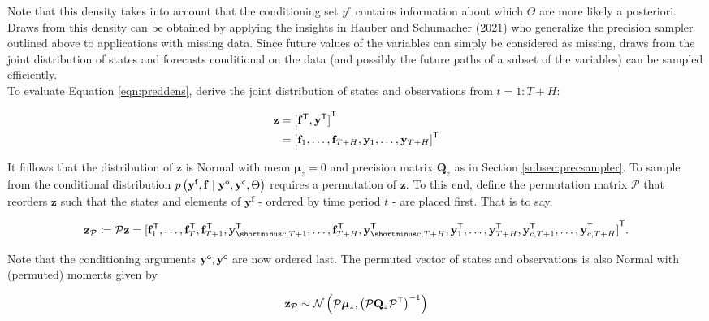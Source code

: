 \documentclass[notitlepage,a4paper,12pt]{article}
\newcommand{\transpose}[1]{{#1}^{\sf{T}}}
\begin{document}
Note that this density takes into account that the conditioning set $y^c$ contains information about which $\Theta$ are more likely a posteriori. Draws from this density can be obtained by applying the insights in Hauber and Schumacher (2021) who generalize the precision sampler outlined above to applications with missing data. Since future values of the variables can simply be considered as missing, draws from the joint distribution of states and forecasts conditional on the data (and possibly the future paths of a subset of the variables) can be sampled efficiently.\\

To evaluate Equation \ref{eqn:preddens}, derive the joint distribution of states and observations from $t=1:T+H$: 

\begin{align*}
    \mathbf{z} &= \transpose{[\transpose{\mathbf{f}}, \transpose{\mathbf{y}}]} \\
     &= \transpose{[\mathbf{f}_1, \dots, \mathbf{f}_{T+H}, \mathbf{y}_1, \dots, \mathbf{y}_{T+H}]} 
\end{align*}

It follows that the distribution of $\mathbf{z}$ is Normal with mean $\boldsymbol{\mu}_{z} = 0$ and precision matrix $\mathbf{Q}_{z}$ as in Section \ref{subsec:precsampler}. To sample from the conditional distribution $p\left(\mathbf{y}^{\sf{f}}, \mathbf{f} \mid \mathbf{y}^{\sf{o}}, \mathbf{y}^{\sf{c}}, \Theta \right)$  requires a permutation of $\mathbf{z}$. To this end, define the permutation matrix $\mathcal{P}$ that reorders $\mathbf{z}$ such that the states and elements of $\mathbf{y^f}$ - ordered by time period $t$ - are placed first. That is to say,

$$
\mathbf{z}_{\mathcal{P}} \coloneqq \mathcal{P} \mathbf{z} =
 \transpose{[
     \mathbf{f}^{\sf{T}}_1, 
     \dots, 
     \mathbf{f}^{\sf{T}}_T, 
     \mathbf{f}^{\sf{T}}_{T+1}, 
     \mathbf{y}^{\sf{T}}_{\shortminus c,T+1}, 
     \dots, 
     \mathbf{f}^{\sf{T}}_{T+H}, 
     \mathbf{y}^{\sf{T}}_{\shortminus c,T+H},
     \mathbf{y}^{\sf{T}}_1,
     \dots,
     \mathbf{y}^{\sf{T}}_{T+H},
     \mathbf{y}^{\sf{T}}_{c, T+1},
     \dots, 
     \mathbf{y}^{\sf{T}}_{c, T+H}]}.
$$

Note that the conditioning arguments $\mathbf{y}^{\sf{o}}, \mathbf{y}^{\sf{c}}$ are now ordered last. The permuted vector of states and observations is also Normal with (permuted) moments given by 

\begin{equation*}
    \mathbf{z_{\mathcal{P}}} \sim \mathcal{N}\left(\mathcal{P}\boldsymbol{\mu}_z, \left(\mathcal{P} \mathbf{Q}_z \transpose{\mathcal{P}}\right)^{-1}\right)
\end{equation*}
\end{document}

